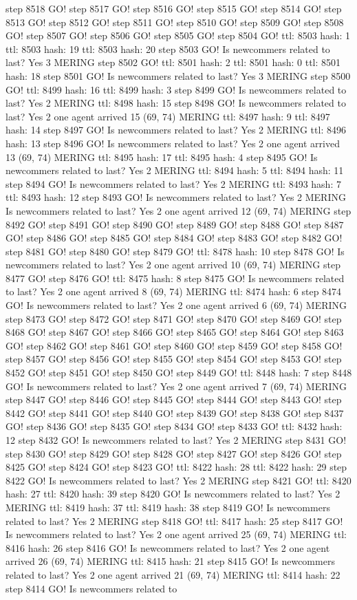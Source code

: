step 8518 GO! step 8517 GO! step 8516 GO! step 8515 GO! step 8514 GO! step 8513 GO! step 8512 GO! step 8511 GO! step 8510 GO! step 8509 GO! step 8508 GO! step 8507 GO! step 8506 GO! step 8505 GO! step 8504 GO! ttl: 8503 hash: 1 ttl: 8503 hash: 19 ttl: 8503 hash: 20 step 8503 GO! Is newcommers related to last? Yes 3 MERING step 8502 GO! ttl: 8501 hash: 2 ttl: 8501 hash: 0 ttl: 8501 hash: 18 step 8501 GO! Is newcommers related to last? Yes 3 MERING step 8500 GO! ttl: 8499 hash: 16 ttl: 8499 hash: 3 step 8499 GO! Is newcommers related to last? Yes 2 MERING ttl: 8498 hash: 15 step 8498 GO! Is newcommers related to last? Yes 2 one agent arrived 15 (69, 74) MERING ttl: 8497 hash: 9 ttl: 8497 hash: 14 step 8497 GO! Is newcommers related to last? Yes 2 MERING ttl: 8496 hash: 13 step 8496 GO! Is newcommers related to last? Yes 2 one agent arrived 13 (69, 74) MERING ttl: 8495 hash: 17 ttl: 8495 hash: 4 step 8495 GO! Is newcommers related to last? Yes 2 MERING ttl: 8494 hash: 5 ttl: 8494 hash: 11 step 8494 GO! Is newcommers related to last? Yes 2 MERING ttl: 8493 hash: 7 ttl: 8493 hash: 12 step 8493 GO! Is newcommers related to last? Yes 2 MERING Is newcommers related to last? Yes 2 one agent arrived 12 (69, 74) MERING step 8492 GO! step 8491 GO! step 8490 GO! step 8489 GO! step 8488 GO! step 8487 GO! step 8486 GO! step 8485 GO! step 8484 GO! step 8483 GO! step 8482 GO! step 8481 GO! step 8480 GO! step 8479 GO! ttl: 8478 hash: 10 step 8478 GO! Is newcommers related to last? Yes 2 one agent arrived 10 (69, 74) MERING step 8477 GO! step 8476 GO! ttl: 8475 hash: 8 step 8475 GO! Is newcommers related to last? Yes 2 one agent arrived 8 (69, 74) MERING ttl: 8474 hash: 6 step 8474 GO! Is newcommers related to last? Yes 2 one agent arrived 6 (69, 74) MERING step 8473 GO! step 8472 GO! step 8471 GO! step 8470 GO! step 8469 GO! step 8468 GO! step 8467 GO! step 8466 GO! step 8465 GO! step 8464 GO! step 8463 GO! step 8462 GO! step 8461 GO! step 8460 GO! step 8459 GO! step 8458 GO! step 8457 GO! step 8456 GO! step 8455 GO! step 8454 GO! step 8453 GO! step 8452 GO! step 8451 GO! step 8450 GO! step 8449 GO! ttl: 8448 hash: 7 step 8448 GO! Is newcommers related to last? Yes 2 one agent arrived 7 (69, 74) MERING step 8447 GO! step 8446 GO! step 8445 GO! step 8444 GO! step 8443 GO! step 8442 GO! step 8441 GO! step 8440 GO! step 8439 GO! step 8438 GO! step 8437 GO! step 8436 GO! step 8435 GO! step 8434 GO! step 8433 GO! ttl: 8432 hash: 12 step 8432 GO! Is newcommers related to last? Yes 2 MERING step 8431 GO! step 8430 GO! step 8429 GO! step 8428 GO! step 8427 GO! step 8426 GO! step 8425 GO! step 8424 GO! step 8423 GO! ttl: 8422 hash: 28 ttl: 8422 hash: 29 step 8422 GO! Is newcommers related to last? Yes 2 MERING step 8421 GO! ttl: 8420 hash: 27 ttl: 8420 hash: 39 step 8420 GO! Is newcommers related to last? Yes 2 MERING ttl: 8419 hash: 37 ttl: 8419 hash: 38 step 8419 GO! Is newcommers related to last? Yes 2 MERING step 8418 GO! ttl: 8417 hash: 25 step 8417 GO! Is newcommers related to last? Yes 2 one agent arrived 25 (69, 74) MERING ttl: 8416 hash: 26 step 8416 GO! Is newcommers related to last? Yes 2 one agent arrived 26 (69, 74) MERING ttl: 8415 hash: 21 step 8415 GO! Is newcommers related to last? Yes 2 one agent arrived 21 (69, 74) MERING ttl: 8414 hash: 22 step 8414 GO! Is newcommers related to 